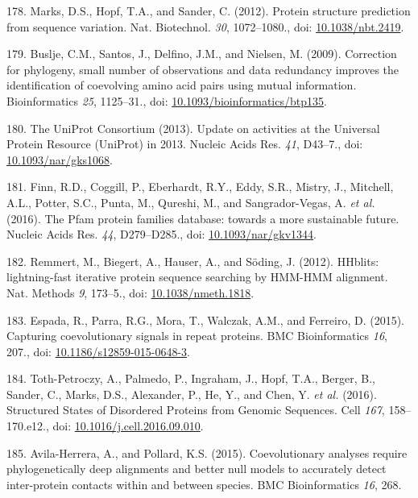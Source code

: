 \documentclass[11pt,a4paper,twoside]{book}
\theoremstyle{definition}
\theoremstyle{definition}
\theoremstyle{remark}
\begin{document}
\hypertarget{ref-Marks2012}{}
178. Marks, D.S., Hopf, T.A., and Sander, C. (2012). Protein structure
prediction from sequence variation. Nat. Biotechnol. \emph{30},
1072--1080., doi:
\href{https://doi.org/10.1038/nbt.2419}{10.1038/nbt.2419}.

\hypertarget{ref-Buslje2009}{}
179. Buslje, C.M., Santos, J., Delfino, J.M., and Nielsen, M. (2009).
Correction for phylogeny, small number of observations and data
redundancy improves the identification of coevolving amino acid pairs
using mutual information. Bioinformatics \emph{25}, 1125--31., doi:
\href{https://doi.org/10.1093/bioinformatics/btp135}{10.1093/bioinformatics/btp135}.

\hypertarget{ref-TheUniProtConsortium2013}{}
180. The UniProt Consortium (2013). Update on activities at the
Universal Protein Resource (UniProt) in 2013. Nucleic Acids Res.
\emph{41}, D43--7., doi:
\href{https://doi.org/10.1093/nar/gks1068}{10.1093/nar/gks1068}.

\hypertarget{ref-Finn2016}{}
181. Finn, R.D., Coggill, P., Eberhardt, R.Y., Eddy, S.R., Mistry, J.,
Mitchell, A.L., Potter, S.C., Punta, M., Qureshi, M., and
Sangrador-Vegas, A. \emph{et al.} (2016). The Pfam protein families
database: towards a more sustainable future. Nucleic Acids Res.
\emph{44}, D279--D285., doi:
\href{https://doi.org/10.1093/nar/gkv1344}{10.1093/nar/gkv1344}.

\hypertarget{ref-Remmert2012}{}
182. Remmert, M., Biegert, A., Hauser, A., and Söding, J. (2012).
HHblits: lightning-fast iterative protein sequence searching by HMM-HMM
alignment. Nat. Methods \emph{9}, 173--5., doi:
\href{https://doi.org/10.1038/nmeth.1818}{10.1038/nmeth.1818}.

\hypertarget{ref-Espada2014}{}
183. Espada, R., Parra, R.G., Mora, T., Walczak, A.M., and Ferreiro, D.
(2015). Capturing coevolutionary signals in repeat proteins. BMC
Bioinformatics \emph{16}, 207., doi:
\href{https://doi.org/10.1186/s12859-015-0648-3}{10.1186/s12859-015-0648-3}.

\hypertarget{ref-Toth-Petroczy2016}{}
184. Toth-Petroczy, A., Palmedo, P., Ingraham, J., Hopf, T.A., Berger,
B., Sander, C., Marks, D.S., Alexander, P., He, Y., and Chen, Y.
\emph{et al.} (2016). Structured States of Disordered Proteins from
Genomic Sequences. Cell \emph{167}, 158--170.e12., doi:
\href{https://doi.org/10.1016/j.cell.2016.09.010}{10.1016/j.cell.2016.09.010}.

\hypertarget{ref-Avila-Herrera2015a}{}
185. Avila-Herrera, A., and Pollard, K.S. (2015). Coevolutionary
analyses require phylogenetically deep alignments and better null models
to accurately detect inter-protein contacts within and between species.
BMC Bioinformatics \emph{16}, 268.
\end{document}

